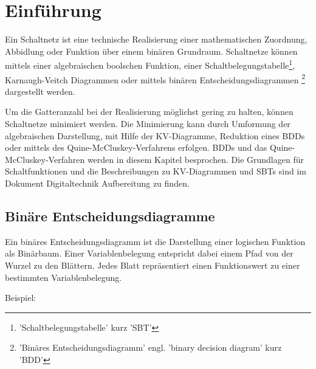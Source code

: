 \chapter{Einführung}
Ein Schaltnetz ist eine technische Realisierung einer mathematischen Zuordnung, Abbidlung oder Funktion über einem binären Grundraum. Schaltnetze können mittels einer algebraischen boolschen Funktion, einer Schaltbelegungstabelle\footnote{'Schaltbelegungstabelle' kurz 'SBT'}, Karnaugh-Veitch Diagrammen oder mittels binären Entscheidungsdiagrammen \footnote{'Binäres Entscheidungsdiagramm' engl. 'binary decision diagram' kurz 'BDD'} dargestellt werden.

Um die Gatteranzahl bei der Realisierung möglichst gering zu halten, können Schaltnetze minimiert werden. Die Minimierung kann durch Umformung der algebraischen Darstellung, mit Hilfe der KV-Diagramme, Reduktion eines BDDs oder mittels des Quine-McCluskey-Verfahrens erfolgen. BDDs und das Quine-McCluskey-Verfahren werden in diesem Kapitel besprochen. Die Grundlagen für Schaltfunktionen und die Beschreibungen zu KV-Diagrammen und SBTs sind im Dokument Digitaltechnik Aufbereitung zu finden. 

\section{Binäre Entscheidungsdiagramme}
Ein binäres Entscheidungsdiagramm ist die Darstellung einer logischen Funktion als Binärbaum. Einer Variablenbelegung entspricht dabei einem Pfad von der Wurzel zu den Blättern. Jedes Blatt repräsentiert einen Funktionswert zu einer bestimmten Variablenbelegung.

Beispiel:
\begin{center}
\end{center}

